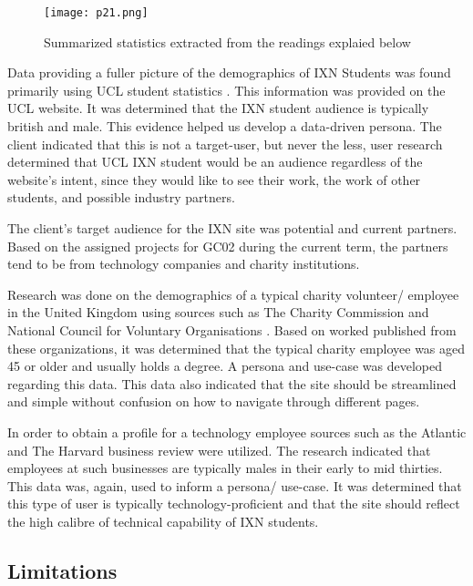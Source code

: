 \documentclass[fontsize=10pt]{extarticle}
\numberwithin{figure}{section} %
\begin{document}
\begin{figure}[H]
      \centering
      \texttt{[image: p21.png]}
      \caption{Summarized statistics extracted from the readings explaied below}
 \end{figure}

Data providing a fuller picture of the demographics of IXN Students was
found primarily using UCL student statistics \cite{ps1}. This
information was provided on the UCL website. It was determined that the
IXN student audience is typically british and male. This evidence helped
us develop a data-driven persona. The client indicated that this is not
a target-user, but never the less, user research determined that UCL IXN
student would be an audience regardless of the website's intent, since
they would like to see their work, the work of other students, and
possible industry partners.

The client's target audience for the IXN site was potential and current
partners. Based on the assigned projects for GC02 during the current
term, the partners tend to be from technology companies and charity
institutions.

Research was done on the demographics of a typical charity volunteer/
employee in the United Kingdom using sources such as The Charity
Commission \cite{ps2} and National Council for Voluntary Organisations
\cite{ps3}. Based on worked published from these organizations, it was
determined that the typical charity employee was aged 45 or older and
usually holds a degree. A persona and use-case was developed regarding
this data. This data also indicated that the site should be streamlined
and simple without confusion on how to navigate through different pages.

In order to obtain a profile for a technology employee sources such as
the Atlantic \cite{ps4} and The Harvard business review \cite{ps5} were
utilized. The research indicated that employees at such businesses are
typically males in their early to mid thirties. This data was, again,
used to inform a persona/ use-case. It was determined that this type of
user is typically technology-proficient and that the site should reflect
the high calibre of technical capability of IXN students.

\hypertarget{limitations}{%
\subsection{Limitations}\label{limitations}}
\end{document}
